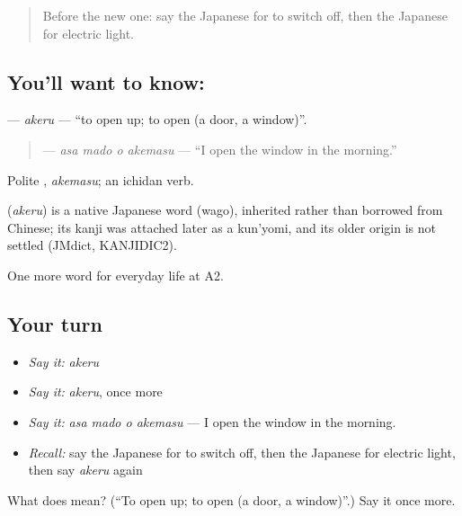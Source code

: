 \begin{quote}
Before the new one: say the Japanese for to switch off, then the Japanese for electric light.
\end{quote}

\subsection*{You'll want to know: }
\textbf{} — \emph{akeru} — \textquotedblleft{}to open up; to open (a door, a window)\textquotedblright{}.

\begin{quote}
\textbf{  } — \emph{asa mado o akemasu} — \textquotedblleft{}I open the window in the morning.\textquotedblright{}
\end{quote}

Polite \textbf{}, \emph{akemasu}; an ichidan verb.

\begin{cousinweb}
\textbf{} (\emph{akeru}) is a native Japanese word (wago), inherited rather than borrowed from Chinese; its kanji was attached later as a kun'yomi, and its older origin is not settled (JMdict, KANJIDIC2).
\end{cousinweb}

\begin{grammarlens}[title={What you've built}]
One more word for everyday life at A2.
\end{grammarlens}

\subsection*{Your turn}
\begin{itemize}
\raggedright
  \item \emph{Say it:} \emph{akeru}
  \item \emph{Say it:} \emph{akeru}, once more
  \item \emph{Say it:} \emph{asa mado o akemasu} — I open the window in the morning.
  \item \emph{Recall:} say the Japanese for to switch off, then the Japanese for electric light, then say \emph{akeru} again
\end{itemize}

\begin{tcolorbox}[breakable,colback=teal!4,colframe=teal!35!black,title={Before you move on}]
What does  mean? (\textquotedblleft{}To open up; to open (a door, a window)\textquotedblright{}.) Say it once more.
\end{tcolorbox}
